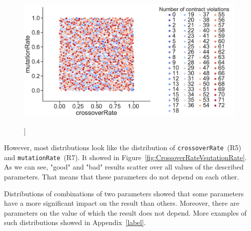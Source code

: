 \begin{figure}
	\centering
	\includegraphics[width=\textwidth]{images/CrossoverRateVsutationRate.pdf}
	\caption[]]{}
	\label{fig:CrossoverRateVmutationRate}
\end{figure}

However, most distributions look like the distribution of \texttt{crossoverRate}~(R5) and \texttt{mutationRate}~(R7). It showed in Figure~\ref{fig:CrossoverRateVsutationRate}. As we can see, "good" and "bad" results scatter over all values of the described parameters. That means that these parameters do not depend on each other.

Distributions of combinations of two parameters showed that some parameters have a more significant impact on the result than others. Moreover, there are parameters on the value of which the result does not depend. More examples of such distributions showed in Appendix~\ref{label}.

